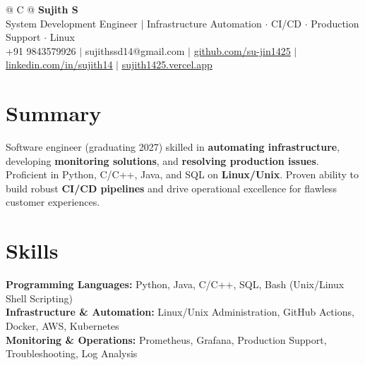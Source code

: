\documentclass[a4paper,10pt]{article}
\newcommand{\ulink}[2]{\href{#1}{\uline{#2}}}
\begin{document}
\pagestyle{empty}

\begin{tabularx}{\linewidth}{@{} C @{}}
{\color[HTML]{000000}\fontsize{30}{35}\selectfont\bfseries Sujith S} \\[5pt]
{\fontsize{10.5}{12.5}\selectfont\color[HTML]{3A3A3A}
System Development Engineer $|$ Infrastructure Automation $\cdot$ CI/CD $\cdot$ Production Support $\cdot$ Linux} \\[6pt]
{\fontsize{9.5}{11.5}\selectfont\textcolor[HTML]{3A3A3A}{+91 9843579926 $|$ sujithssd14@gmail.com $|$ \ulink{https://github.com/su-jin1425}{github.com/su-jin1425} $|$ \ulink{https://linkedin.com/in/sujith14}{linkedin.com/in/sujith14} $|$ \ulink{https://sujith1425.vercel.app}{sujith1425.vercel.app}}}
\end{tabularx}

\vspace{2pt}

\section{Summary}
\vspace{3pt}
{\color[HTML]{0A0A0A}\fontsize{11}{14}\selectfont
Software engineer (graduating 2027) skilled in \textbf{automating infrastructure}, developing \textbf{monitoring solutions}, and \textbf{resolving production issues}. Proficient in Python, C/C++, Java, and SQL on \textbf{Linux/Unix}. Proven ability to build robust \textbf{CI/CD pipelines} and drive operational excellence for flawless customer experiences.}

\vspace{2pt}

\section{Skills}
\vspace{3pt}
{\color[HTML]{0A0A0A}\fontsize{11}{14}\selectfont
\textbf{Programming Languages:} Python, Java, C/C++, SQL, Bash (Unix/Linux Shell Scripting) \\[2pt]
\textbf{Infrastructure \& Automation:} Linux/Unix Administration, GitHub Actions, Docker, AWS, Kubernetes \\[2pt]
\textbf{Monitoring \& Operations:} Prometheus, Grafana, Production Support, Troubleshooting, Log Analysis}

\vspace{2pt}
\end{document}

